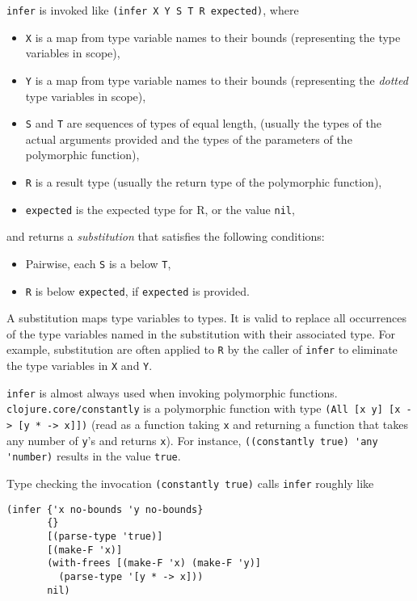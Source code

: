 \lstinline|infer| is invoked like \lstinline|(infer X Y S T R expected)|, where

\begin{itemize}
  \item \lstinline|X| is a map from type variable names
        to their bounds (representing the type variables in scope),
  \item \lstinline|Y| is a map from type variable names
        to their bounds (representing the \emph{dotted} type variables in scope),
  \item \lstinline|S| and \lstinline|T| are sequences of types of equal length,
        (usually the types of the actual arguments provided and the types of the parameters
        of the polymorphic function),
  \item \lstinline|R| is a result type (usually the return type of the polymorphic function),
  \item \lstinline|expected| is the expected type for R, or the value \lstinline|nil|,
\end{itemize}

and returns a \emph{substitution} that satisfies the following conditions:

\begin{itemize}
  \item Pairwise, each \lstinline|S| is a below \lstinline|T|,
  \item \lstinline|R| is below \lstinline|expected|, if \lstinline|expected| is provided.
\end{itemize}

A substitution maps type variables to types.
It is valid to replace all occurrences of the type variables named in the substitution 
with their associated type.
For example, substitution are often applied to \lstinline|R| by the caller of \lstinline|infer|
to eliminate the type variables in \lstinline|X| and \lstinline|Y|.

\lstinline|infer| is almost always used when invoking polymorphic functions.
\lstinline|clojure.core/constantly| is a polymorphic function with type \lstinline|(All [x y] [x -> [y * -> x]])|
(read as a function taking \lstinline|x| and returning a function that takes any number
of \lstinline|y|'s and returns \lstinline|x|).
For instance, \lstinline|((constantly true) 'any 'number)| results in the value \lstinline|true|.

Type checking the invocation \lstinline|(constantly true)|
calls \lstinline|infer| roughly like

\begin{lstlisting}
(infer {'x no-bounds 'y no-bounds}
       {}
       [(parse-type 'true)]
       [(make-F 'x)]
       (with-frees [(make-F 'x) (make-F 'y)]
         (parse-type '[y * -> x]))
       nil)
\end{lstlisting}


